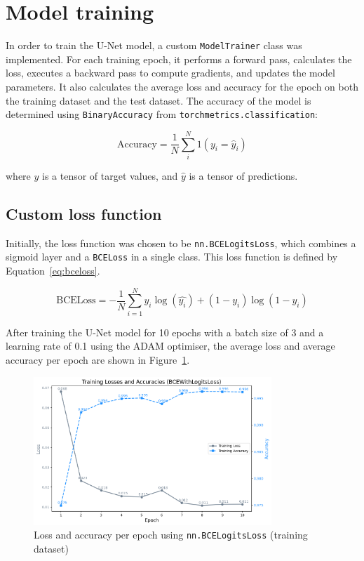 \documentclass[12pt]{report}
\newcommand{\inlinecode}[1]{\lstinline[style=inline]{#1}}
\begin{document}
\section{Model training}

In order to train the U-Net model, a custom \inlinecode{ModelTrainer} class was implemented. For each training epoch, it performs a forward pass, calculates the loss, executes a backward pass to compute gradients, and updates the model parameters. It also calculates the average loss and accuracy for the epoch on both the training dataset and the test dataset. The accuracy of the model is determined using \inlinecode{BinaryAccuracy} from \inlinecode{torchmetrics.classification}:

\begin{equation}
    \text{Accuracy} = \frac{1}{N}\sum_i^N 1(y_i = \hat{y}_i)
    \label{eq:accuracy}
\end{equation}

where $y$ is a tensor of target values, and $\hat{y}$ is a tensor of predictions.

\subsection{Custom loss function}

Initially, the loss function was chosen to be \inlinecode{nn.BCELogitsLoss}, which combines a sigmoid layer and a \inlinecode{BCELoss} in a single class. This loss function is defined by Equation~\ref{eq:bceloss}.

\begin{equation}
    \text{BCELoss} = -\frac{1}{N}\sum_{i=1}^{N} y_{i}\log(\hat{y_{i}}) + (1-y_{i})\log(1-\hat{y_{i}})
    \label{eq:bceloss}
\end{equation}

After training the U-Net model for 10 epochs with a batch size of 3 and a learning rate of 0.1 using the ADAM optimiser,\cite{kingma_adam_2017} the average loss and average accuracy per epoch are shown in Figure~\ref{fig:bce_loss}.

\begin{figure}[ht]
    \centering
    \includegraphics[width=0.8\textwidth]{bceloss.png}
    \caption{Loss and accuracy per epoch using \inlinecode{nn.BCELogitsLoss} (training dataset)}
    \label{fig:bce_loss}
\end{figure}
\end{document}
